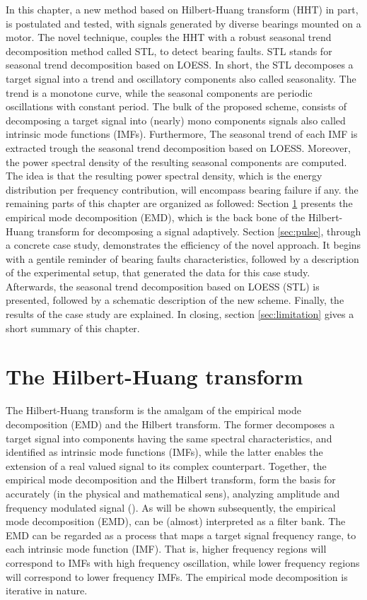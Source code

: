 \documentclass[../Main/thesis.tex]{subfiles}
\begin{document}
\justify
In this chapter, a new method based on Hilbert-Huang transform (HHT) in part, is postulated and tested, with signals generated by diverse bearings mounted on a motor. The novel technique, couples the HHT with a robust seasonal trend decomposition method called STL, to detect bearing faults. STL stands for seasonal trend decomposition based on LOESS. In short, the STL decomposes a target signal into a trend and oscillatory components also called  seasonality. The trend is a monotone curve, while the seasonal components are periodic oscillations with constant period.
\justify
The bulk of the proposed scheme, consists of decomposing a target signal into (nearly) mono components signals also called intrinsic mode functions (IMFs). Furthermore, The seasonal trend of each IMF is extracted trough the seasonal trend decomposition based on LOESS. Moreover, the power spectral density of the resulting seasonal components are computed. The idea is that the resulting power spectral density, which is the energy distribution per frequency contribution, will encompass bearing failure if any.
\justify
the remaining parts of this chapter are organized as followed:
 Section \ref{sec:emd} presents the empirical mode decomposition (EMD), which is the back bone of the Hilbert-Huang transform for decomposing a signal adaptively. Section \ref{sec:pulse}, through a concrete case study, demonstrates the efficiency of the novel approach. It begins with a gentile reminder of  bearing faults characteristics, followed by a description of the experimental setup, that generated the data for this case study. Afterwards, the seasonal trend decomposition based on LOESS (STL) is presented, followed by a schematic description of the new scheme. Finally, the results of the case study are explained. In closing, section \ref{sec:limitation} gives a short summary of this chapter.
\justify



 
 \section{The Hilbert-Huang transform}
 \label{sec:emd}
 The Hilbert-Huang transform is the amalgam of the empirical mode decomposition (EMD) and the Hilbert transform.
  The former decomposes a target signal into components having the same spectral characteristics, and identified as intrinsic mode functions (IMFs), while the latter enables the extension of a real valued signal to its complex counterpart. Together, the empirical mode decomposition and the Hilbert transform, form the basis for accurately (in the physical and mathematical sens), analyzing amplitude and frequency modulated signal (\cite{huang98}).
\justify
As will be shown subsequently, the empirical mode decomposition (EMD), can be (almost) interpreted as a filter bank. The EMD can be regarded as a process that maps a target signal frequency range, to each intrinsic mode function (IMF). That is, higher frequency regions will correspond to IMFs with high frequency oscillation, while lower frequency regions will correspond to lower frequency IMFs. The empirical mode decomposition is iterative in nature.
\end{document}
